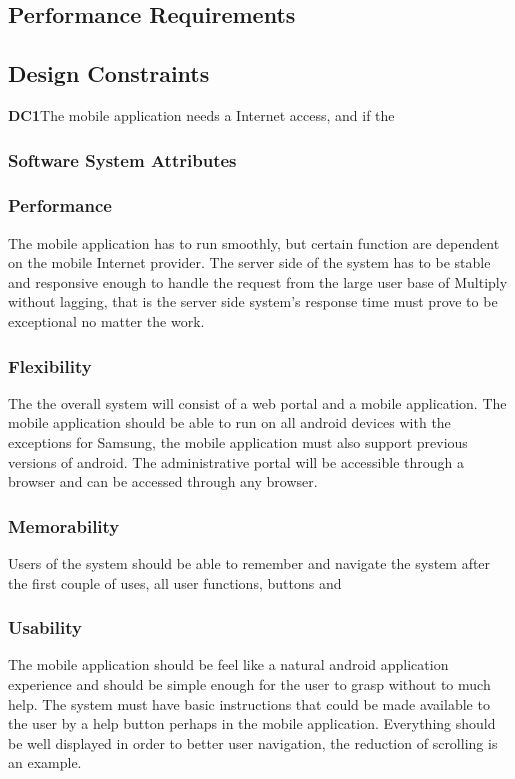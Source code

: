 \documentclass[11pt]{article}
\begin{document}
\subsection{Performance Requirements}

\subsection{Design Constraints}
\textbf{DC1}The mobile application needs a Internet access, and if the 
\subsubsection{Software System Attributes}
\subsubsection{Performance}
The mobile application has to run smoothly, but certain function are dependent on the mobile Internet provider. The server side of the system has to be stable and responsive enough to handle the request from the large user base of Multiply without lagging, that is the server side system's response time must prove to be exceptional no matter the work.
\subsubsection{Flexibility}
The the overall system will consist of a web portal and a mobile application. The mobile application should be able to run on all android devices with the exceptions for Samsung, the mobile application must also support previous versions of android. The administrative portal will be accessible through a browser and can be accessed through any browser.
\subsubsection{Memorability}
Users of the system should be able to remember and navigate the system after the first couple of uses, all user functions, buttons and   
\subsubsection{Usability}
The mobile application should be feel like a natural android application experience and should be simple enough for the user to grasp without to much help. The system must have basic instructions that could be made available to the user by a help button perhaps in the mobile application. Everything should be well displayed in order to better user navigation, the reduction of scrolling is an example.
\end{document}
